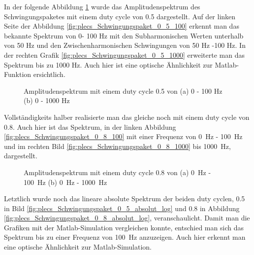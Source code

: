 In der folgende Abbildung \ref{fig:plecs_Schwingungspakete_Amplitudenspektrum_ 0_5_100_1000} wurde das Amplitudenspektrum des Schwingungspaketes mit einem duty cycle von 0.5 dargestellt. Auf der linken Seite der Abbildung \ref{fig:plecs_Schwingungspaket_0_5_100} erkennt man das bekannte Spektrum von 0- 100 Hz mit den Subharmonischen Werten unterhalb von 50 Hz und den Zwischenharmonischen Schwingungen von 50 Hz -100 Hz. In der rechten Grafik  \ref{fig:plecs_Schwingungspaket_0_5_1000} erweiterte man das Spektrum bis zu 1000 Hz. Auch hier ist eine optische Ähnlichkeit zur  Matlab-Funktion ersichtlich.     
\begin{figure}[ht!]
	\centering
	\qquad
	\caption{Amplitudenspektrum mit einem duty cycle 0.5 von (a) 0 - 100 Hz (b) 0 - 1000 Hz}
	\label{fig:plecs_Schwingungspakete_Amplitudenspektrum_ 0_5_100_1000}
\end{figure}


Vollständigkeits halber realisierte man das gleiche noch mit einem duty cycle von 0.8. Auch hier ist das Spektrum, in der linken Abbildung \ref{fig:plecs_Schwingungspaket_0_8_100} mit einer Frequenz von \SI{0}{Hz} - \SI{100}{Hz} und im rechten Bild \ref{fig:plecs_Schwingungspaket_0_8_1000} bis \SI{1000}{Hz}, dargestellt. 


\begin{figure}[ht!]
	\centering
	\qquad
	\caption{Amplitudenspektrum mit einem duty cycle 0.8 von (a) \SI{0}{Hz} - \SI{100}{Hz} (b) \SI{0}{Hz} - \SI{1000}{Hz}}
	\label{fig:plecs_Schwingungspakete_Amplitudenspektrum_ 0_8_100_1000}
\end{figure}


Letztlich wurde noch das lineare absolute Spektrum der beiden duty cyclen, 0.5 in Bild \ref{fig:plecs_Schwingungspaket_0_5_absolut_log} und 0.8 in Abbildung \ref{fig:plecs_Schwingungspaket_0_8_absolut_log}, veranschaulicht. Damit man die Grafiken mit der Matlab-Simulation vergleichen konnte, entschied man sich das Spektrum bis zu einer Frequenz von \SI{100}{Hz} anzuzeigen. Auch hier erkennt man eine optische Ähnlichkeit zur Matlab-Simulation. 



